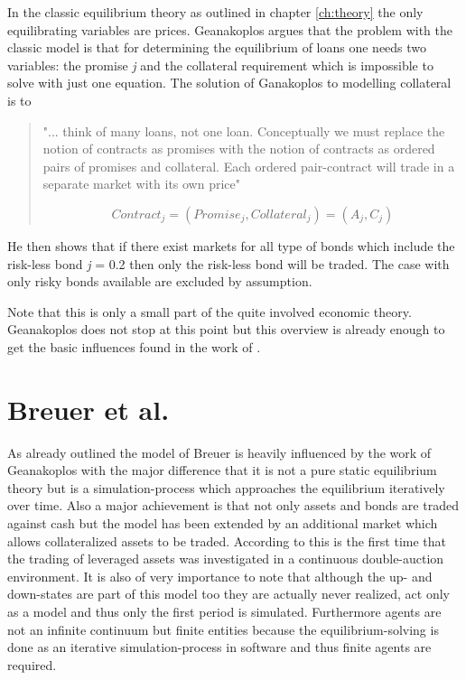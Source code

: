 \documentclass[../Bachelorarbeit.tex]{subfiles}
\begin{document}
\medskip

In the classic equilibrium theory as outlined in chapter \ref{ch:theory} the only equilibrating variables are prices. Geanakoplos argues that the problem with the classic model is that for determining the equilibrium of loans one needs two variables: the promise \textit{j} and the collateral requirement which is impossible to solve with just one equation.
The solution of Ganakoplos to modelling collateral is to

\begin{quote}
"... think of many loans, not one loan. Conceptually we must replace the notion of contracts as promises with the notion of contracts as ordered pairs of promises and collateral. Each ordered pair-contract will trade in a separate market with its own price"

\begin{equation}
Contract_j = (Promise_j, Collateral_j) = (A_j, C_j)
\end{equation}
\end{quote}

He then shows that if there exist markets for all type of bonds which include the risk-less bond \textit{j} = 0.2 then only the risk-less bond will be traded. The case with only risky bonds available are excluded by assumption.

\medskip

Note that this is only a small part of the quite involved economic theory. Geanakoplos does not stop at this point but this overview is already enough to get the basic influences found in the work of \cite{Breuer2015}.

\section{Breuer et al.}
As already outlined the model of Breuer is heavily influenced by the work of Geanakoplos with the major difference that it is not a pure static equilibrium theory but is a simulation-process which approaches the equilibrium iteratively over time. Also a major achievement is that not only assets and bonds are traded against cash but the model has been extended by an additional market which allows collateralized assets to be traded. According to \cite{Breuer2015} this is the first time that the trading of leveraged assets was investigated in a continuous double-auction environment. It is also of very importance to note that although the up- and down-states are part of this model too they are actually never realized, act only as a model and thus only the first period is simulated. Furthermore agents are not an infinite continuum but finite entities because the equilibrium-solving is done as an iterative simulation-process in software and thus finite agents are required.
\end{document}
